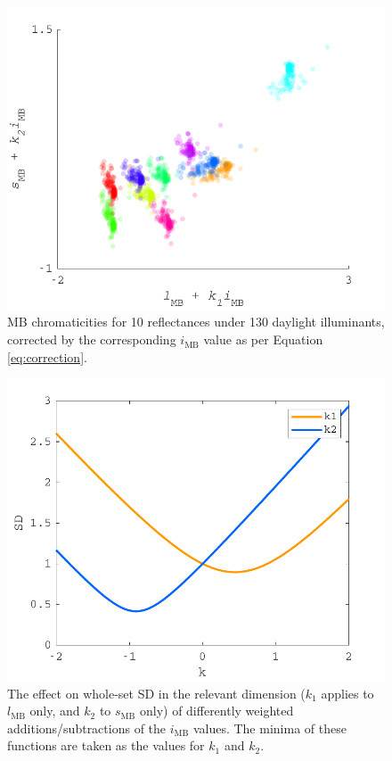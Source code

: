 \begin{figure}[htbp]
    \includegraphics[max width=\textwidth]{figs/comp/transformToIllIndSpace/correctedChromaticities.pdf}
    \caption{\gls{MB} chromaticities for 10 reflectances under 130 daylight illuminants, corrected by the corresponding $i_{\text{MB}}$ value as per Equation \ref{eq:correction}.}
    \label{fig:corrected}
\end{figure} 

\begin{figure}[htbp]
    \includegraphics[max width=\textwidth]{figs/comp/transformToIllIndSpace/kvsSD.pdf}
    \caption{The effect on whole-set SD in the relevant dimension ($k_{1}$ applies to $l_{\text{MB}}$ only, and $k_{2}$ to $s_{\text{MB}}$ only) of differently weighted additions/subtractions of the $i_{\text{MB}}$ values. The minima of these functions are taken as the values for $k_{1}$ and $k_{2}$.}
    \label{fig:minSD}
\end{figure} 


